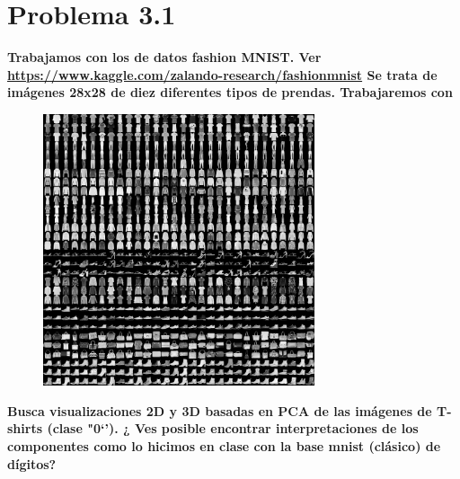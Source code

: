 \section*{Problema 3.1}

\textbf{Trabajamos con los de datos fashion MNIST. Ver \url{https://www.kaggle.com/zalando-research/fashionmnist} Se trata de imágenes 28x28 de diez diferentes tipos de prendas. Trabajaremos con }

\begin{figure}[H]
    \centering
    \includegraphics[width=8cm]{Graphics/Problema_3_1.png}
    \caption{}
\end{figure}

\textbf{Busca visualizaciones 2D y 3D basadas en PCA de las imágenes de T-shirts (clase "0`'). ¿ Ves posible encontrar interpretaciones de los componentes como lo hicimos en clase con la base mnist (clásico) de dígitos?}